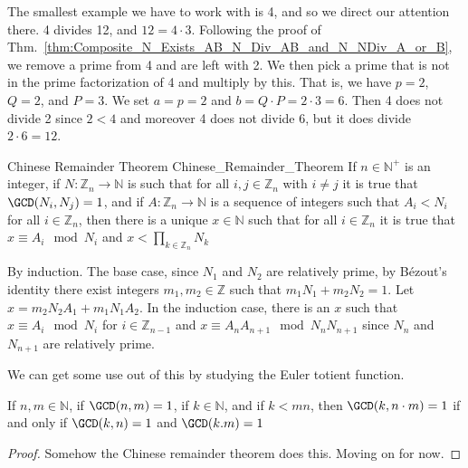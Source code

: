     \begin{example}
        The smallest example we have to work with is 4, and so we direct
        our attention there. 4 divides 12, and $12=4\cdot{3}$. Following
        the proof of
        Thm.~\ref{thm:Composite_N_Exists_AB_N_Div_AB_and_N_NDiv_A_or_B},
        we remove a prime from 4 and are left with 2. We then pick a
        prime that is not in the prime factorization of 4 and multiply
        by this. That is, we have $p=2$, $Q=2$, and $P=3$. We set
        $a=p=2$ and $b=Q\cdot{P}=2\cdot{3}=6$. Then 4 does not divide 2
        since $2<4$ and moreover 4 does not divide 6, but it does divide
        $2\cdot{6}=12$.
    \end{example}
    \begin{ftheorem}{Chinese Remainder Theorem}
                    {Chinese_Remainder_Theorem}
        If $n\in\mathbb{N}^{+}$ is an integer, if
        $N:\mathbb{Z}_{n}\rightarrow\mathbb{N}$ is such that for all
        $i,j\in\mathbb{Z}_{n}$ with $i\ne{j}$ it is true that
        $\GCD(N_{i},N_{j})=1$, and if
        $A:\mathbb{Z}_{n}\rightarrow\mathbb{N}$ is a sequence of
        integers such that $A_{i}<N_{i}$ for all $i\in\mathbb{Z}_{n}$,
        then there is a unique $x\in\mathbb{N}$ such that for all
        $i\in\mathbb{Z}_{n}$ it is true that $x\equiv{A}_{i}\mod{N}_{i}$
        and $x<\prod_{k\in\mathbb{Z}_{n}}N_{k}$
    \end{ftheorem}
    \begin{bproof}
        By induction. The base case, since $N_{1}$ and $N_{2}$ are
        relatively prime, by B\'{e}zout's identity there exist integers
        $m_{1},m_{2}\in\mathbb{Z}$ such that $m_{1}N_{1}+m_{2}N_{2}=1$.
        Let $x=m_{2}N_{2}A_{1}+m_{1}N_{1}A_{2}$. In the induction case,
        there is an $x$ such that $x\equiv{A}_{i}\mod{N}_{i}$ for
        $i\in\mathbb{Z}_{n-1}$ and $x\equiv{A}_{n}A_{n+1}\mod{N}_{n}N_{n+1}$
        since $N_{n}$ and $N_{n+1}$ are relatively prime.
    \end{bproof}
    We can get some use out of this by studying the Euler totient
    function.
    \begin{theorem}
        \label{thm:Rel_Prime_to_Prod_of_Rel_Primes}%
        If $n,m\in\mathbb{N}$, if $\GCD(n,m)=1$, if $k\in\mathbb{N}$,
        and if $k<mn$, then $\GCD(k,n\cdot{m})=1$ if and only if
        $\GCD(k,n)=1$ and $\GCD(k.m)=1$
    \end{theorem}
    \begin{proof}
        Somehow the Chinese remainder theorem does this. Moving on for
        now.
    \end{proof}
